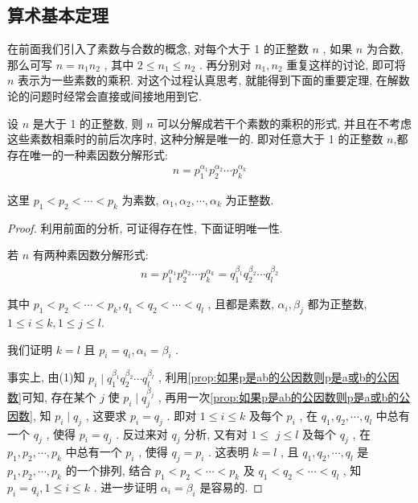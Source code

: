 \subsection{算术基本定理}
在前面我们引入了素数与合数的概念, 对每个大于 1 的正整数 $n$ , 如果 $n$ 为合数, 那么可写 $n=n_{1} n_{2}$ , 其中 $2 \leqslant n_{1} \leqslant n_{2}$ . 再分别对 $n_{1} ,  n_{2}$ 重复这样的讨论, 即可将 $n$ 表示为一些素数的乘积. 对这个过程认真思考, 就能得到下面的重要定理, 在解数论的问题时经常会直接或间接地用到它.
\begin{theorem}[算术基本定理]
	设 $n$ 是大于 1 的正整数, 则 $n$ 可以分解成若干个素数的乘积的形式, 并且在不考虑这些素数相乘时的前后次序时, 这种分解是唯一的. 即对任意大于 1 的正整数 $n$,都存在唯一的一种素因数分解形式:
	\begin{align*}
		n=p_{1}^{\alpha_{1}} p_{2}^{\alpha_{2}} \cdots p_{k}^{\alpha_{k}}
	\end{align*}

	这里 $p_{1}<p_{2}<\cdots<p_{k}$ 为素数,  $\alpha_{1}, \alpha_{2}, \cdots, \alpha_{k}$ 为正整数.
\end{theorem}
\begin{proof}
	利用前面的分析, 可证得存在性, 下面证明唯一性.

	若 $n$ 有两种素因数分解形式:
	\begin{align*}
		n=p_{1}^{\alpha_{1}} p_{2}^{\alpha_{2}} \cdots p_{k}^{\alpha_{k}}=q_{1}^{\beta_{1}} q_{2}^{\beta_{2}} \cdots q_{l}^{\beta_{2}}
	\end{align*}

	其中 $p_{1}<p_{2}<\cdots<p_{k}, q_{1}<q_{2}<\cdots<q_{l}$ , 且都是素数,  $\alpha_{i} ,  \beta_{j}$ 都为正整数,  $1 \leqslant i \leqslant k, 1 \leqslant j \leqslant l$.

	我们证明 $k=l$ 且 $p_{i}=q_{i}, \alpha_{i}=\beta_{i}$ .

	事实上, 由(1)知 $p_{i} \mid q_{1}^{\beta_{1}} q_{2}^{\beta_{2}} \cdots q_{l}^{\beta_{l}}$ , 利用\autoref{prop:如果p是ab的公因数则p是a或b的公因数}可知, 存在某个 $j$ 使 $p_{i} \mid q_{j}^{\beta_{j}}$ , 再用一次\autoref{prop:如果p是ab的公因数则p是a或b的公因数}, 知 $p_{i} \mid q_{j}$ , 这要求 $p_{i}=q_{j}$ . 即对 $1 \leqslant i \leqslant k$ 及每个 $p_{i}$ , 在 $q_{1}, q_{2}, \cdots, q_{l}$ 中总有一个 $q_{j}$ , 使得 $p_{i}=q_{j}$ . 反过来对 $q_{j}$ 分析, 又有对 $1 \leqslant$ $j \leqslant l$ 及每个 $q_{j}$ , 在 $p_{1}, p_{2}, \cdots, p_{k}$ 中总有一个 $p_{i}$ , 使得 $q_{j}=p_{i}$ . 这表明 $k=l$ , 且 $q_{1}, q_{2}, \cdots, q_{l}$ 是 $p_{1}, p_{2}, \cdots, p_{k}$ 的一个排列, 结合 $p_{1}<p_{2}<\cdots<p_{k}$ 及 $q_{1}<q_{2}<\cdots<q_{l}$ , 知 $p_{i}=q_{i}, 1 \leqslant i \leqslant k$ . 进一步证明 $\alpha_{i}=\beta_{i}$ 是容易的.
\end{proof}

